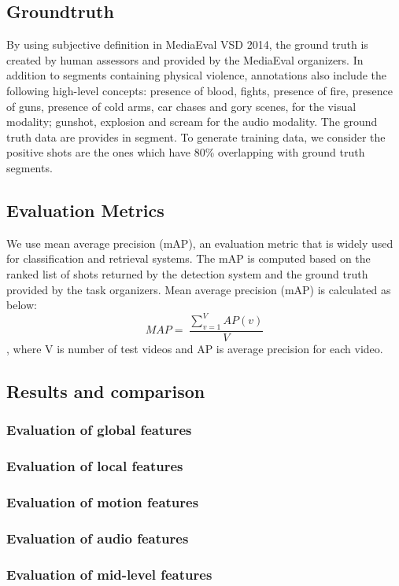 \documentclass[review]{elsarticle}
\begin{document}
\subsection{Groundtruth}
By using subjective definition in MediaEval VSD 2014\cite{demarty2014benchmarking}, the ground truth is created by human assessors and provided by the MediaEval organizers. In addition to segments containing physical violence, annotations also include the following high-level concepts: presence of blood, fights, presence of fire, presence of guns, presence of cold arms, car chases and gory scenes, for the visual modality; gunshot, explosion and scream for the audio modality. The ground truth data are provides in segment. To generate training data, we consider the positive shots are the ones which have 80\% overlapping with ground truth segments.
\subsection{Evaluation Metrics}
We use mean average precision (mAP), an evaluation metric that is widely used for classification and retrieval systems. The mAP is computed based on the ranked list of shots returned by the detection system and the ground truth provided by the task organizers. Mean average precision (mAP) is calculated as below:
\[
MAP=\ \frac{\sum_{v=1}^VAP(v)}{V}
\]
, where V is number of test videos and AP is average precision for each video.
\subsection{Results and comparison}
\subsubsection{Evaluation of global features}
\subsubsection{Evaluation of local features}
\subsubsection{Evaluation of motion features}
\subsubsection{Evaluation of audio features}
\subsubsection{Evaluation of mid-level features}
\end{document}

